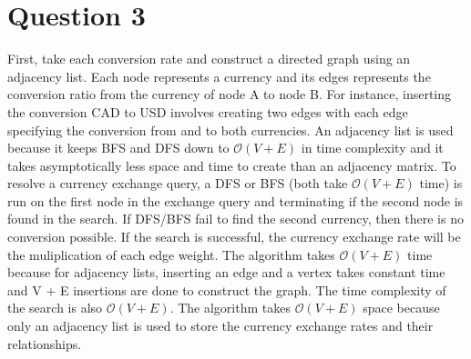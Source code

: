 
\section{Question 3}
First, take each conversion rate and construct a directed graph using an adjacency list.
Each node represents a currency and its edges represents the conversion ratio from the currency of node A to node B.
For instance, inserting the conversion CAD to USD involves creating two edges with each edge specifying the conversion from and to both currencies.
An adjacency list is used because it keeps BFS and DFS down to $\mathcal{O}(V + E)$ in time complexity and
it takes asymptotically less space and time to create than an adjacency matrix.
\linebreak
To resolve a currency exchange query, a DFS or BFS (both take $\mathcal{O}(V + E)$ time) is run on the first node in the exchange query and
terminating if the second node is found in the search. If DFS/BFS fail to find the second currency, then there is no conversion possible.
If the search is successful, the currency exchange rate will be the muliplication of each edge weight.
\linebreak
The algorithm takes $\mathcal{O}(V + E)$ time because for adjacency lists, inserting an edge and a vertex takes constant time and V + E insertions
are done to construct the graph. The time complexity of the search is also $\mathcal{O}(V + E)$.
The algorithm takes $\mathcal{O}(V + E)$ space because only an adjacency list is used to store the currency exchange rates and their relationships.